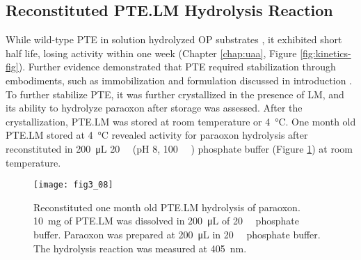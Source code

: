 \begin{refsection}
\subsection{Reconstituted PTE.LM Hydrolysis Reaction}

While wild-type PTE in solution hydrolyzed OP substrates \cite{Yang2014a,Baker2011b},
it exhibited short half life, losing activity within one week (Chapter
\ref{chap:uaa}, Figure \ref{fig:kinetics-fig}). Further evidence demonstrated
that PTE required stabilization through embodiments, such as immobilization and
formulation discussed in introduction
\cite{Chen1998,Gill2000,Havens1993,Masson2009a}. To further stabilize PTE, it
was further crystallized in the presence of LM, and its ability to hydrolyze
paraoxon after storage was assessed. After the crystallization, PTE.LM was
stored at room temperature or \SI{4}{\celsius}. One month old PTE.LM stored at
\SI{4}{\celsius} revealed activity for paraoxon hydrolysis after reconstituted
in \SI{200}{\micro\liter} \SI{20}{\milli\Molar} (pH 8, \SI{100}{\micro\Molar}
) phosphate buffer (Figure \ref{fig:ptelm-one-month}) at room
temperature. 
\begin{figure}[htbp] \centering \texttt{[image: fig3\_08]}
    \caption[Reconstituted one month old PTE.LM hydrolysis of paraoxon.
        \SI{10}{\mg} of PTE.LM was dissolved in \SI{200}{\micro\liter} of
        \SI{20}{\milli\Molar} phosphate buffer. Paraoxon was prepared at
        \SI{200}{\micro\liter} in \SI{20}{\milli\Molar} phosphate buffer. The
    hydrolysis reaction was measured at \SI{405}{\nm}.] {Reconstituted one month
        old PTE.LM hydrolysis of paraoxon.  \SI{10}{\mg} of PTE.LM was
        dissolved in \SI{200}{\micro\liter} of \SI{20}{\milli\Molar} phosphate
        buffer.  Paraoxon was prepared at \SI{200}{\micro\liter} in
        \SI{20}{\milli\Molar} phosphate buffer. The hydrolysis reaction was
        measured at \SI{405}{\nm}.} 
        \label{fig:ptelm-one-month} 
\end{figure}


\end{refsection}
